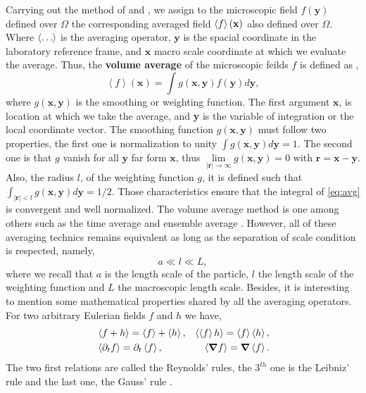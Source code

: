 
Carrying out the method of \citet{drew1983mathematical,zhang1994averaged} and \citet{jackson1997locally},  we assign to the microscopic field $f(\textbf{y})$ defined over $\Omega$ the corresponding averaged field $\left<f\right>(\textbf{x})$ also defined over $\Omega$.
Where $\left<\ldots\right>$ is the averaging operator, $\textbf{y}$ is the spacial coordinate in the laboratory reference frame,
and $\textbf{x}$ macro scale coordinate at which we evaluate the average.
Thus, the \textbf{volume average} of the microscopic feilds $f$ is defined as \citep{nott2011suspension,jackson1997locally,marle1982macroscopic},
\begin{equation}
    \left<f\right>(\textbf{x}) = \int g(\textbf{x},\textbf{y}) f(\textbf{y})d \textbf{y},
    \label{eq:avg}
\end{equation}
where $g(\textbf{x},\textbf{y})$ is the smoothing or weighting function.
The first argument $\textbf{x}$, is location at which we take the average, and \textbf{y} is the variable of integration or the local coordinate vector.
The smoothing function $g(\textbf{x},\textbf{y})$ must follow two properties, the first one is normalization to unity
$\int g(\textbf{x},\textbf{y}) d\textbf{y} = 1$.
The second one is that $g$ vanish for all $\textbf{y}$ far form $\textbf{x}$, thus $\lim\limits_{|\textbf{r}| \to \infty} g(\textbf{x},\textbf{y}) = 0$ with $\textbf{r} = \textbf{x} - \textbf{y}$.
Also, the radius $l$, of the weighting function $g$, it is defined such that $\int_{|\textbf{r}|<l} g(\textbf{x},\textbf{y})d\textbf{y} = 1/2$.
Those characteristics ensure that the integral of \ref{eq:avg} is convergent and well normalized.
The volume average method is one among others such as the time average \citep{ishii2010thermo} and ensemble average \citep{zhang1994averaged}. 
However, all of these averaging technics remains equivalent \citep{jackson1997locally} as long as the separation of scale condition is respected, namely,
\begin{equation*}
    a \ll l \ll L,
\end{equation*}
where we recall that $a$ is the length scale of the particle, $l$ the length scale of the weighting function and $L$ the macroscopic length scale.
Besides, it is interesting to mention some mathematical properties shared by all the averaging operators. 
For two arbitrary Eulerian fields $f$ and $h$ we have,
\begin{align}
    &\left<f+h\right> = \left<f\right>+\left<h\right>, 
    &\left<\left<f\right>h\right> = \left<f\right>\left<h\right>, \nonumber \\
    &\left<\partial_t f\right> 
    = \partial_t\left<f\right>, 
    &\left<\bm{\nabla} f\right>
    = \bm{\nabla} \left<f\right>. 
    \label{eq:avg_properties}
\end{align}
The two first relations are called the Reynolds' rules, the $3^{th}$ one is the Leibniz' 
rule and the last one, the Gauss' rule \citep{drew1983mathematical}.

